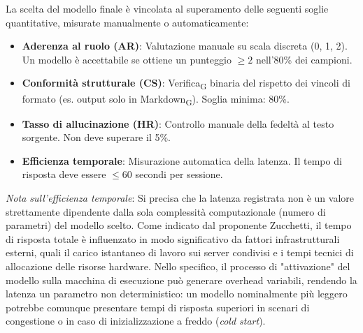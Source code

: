 \documentclass[11pt,a4paper]{article}
\newcommand{\gls}[1]{#1\textsubscript{G}}
\begin{document}
La scelta del modello finale è vincolata al superamento delle seguenti soglie quantitative, misurate manualmente o automaticamente:
\begin{itemize}
    \item \textbf{Aderenza al ruolo (AR)}: Valutazione manuale su scala discreta (0, 1, 2). Un modello è accettabile se ottiene un punteggio $\ge 2$ nell'80\% dei campioni.
    \item \textbf{Conformità strutturale (CS)}: \gls{Verifica} binaria del rispetto dei vincoli di formato (es. output solo in \gls{Markdown}). Soglia minima: 80\%.
    \item \textbf{Tasso di allucinazione (HR)}: Controllo manuale della fedeltà al testo sorgente. Non deve superare il 5\%.
    \item \textbf{Efficienza temporale}: Misurazione automatica della latenza. Il tempo di risposta deve essere $\le 60$ secondi per sessione.
\end{itemize}

\textit{Nota sull'efficienza temporale}: Si precisa che la latenza registrata non è un valore strettamente dipendente dalla sola complessità computazionale (numero di parametri) del modello scelto. Come indicato dal proponente Zucchetti, il tempo di risposta totale è influenzato in modo significativo da fattori infrastrutturali esterni, quali il carico istantaneo di lavoro sui server condivisi e i tempi tecnici di allocazione delle risorse hardware. Nello specifico, il processo di "attivazione" del modello sulla macchina di esecuzione può generare overhead variabili, rendendo la latenza un parametro non deterministico: un modello nominalmente più leggero potrebbe comunque presentare tempi di risposta superiori in scenari di congestione o in caso di inizializzazione a freddo (\textit{cold start}).
\end{document}
